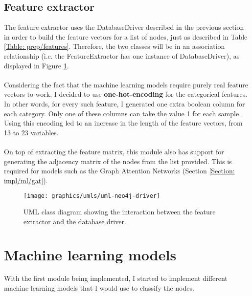 	\subsection{Feature extractor} \label{Section: impl/neo4j/features}
	The feature extractor uses the DatabaseDriver described in the previous section in order to build the feature vectors for a list of nodes, just as described in Table \ref{Table: prep/features}. Therefore, the two classes will be in an association relationship (i.e. the FeatureExtractor has one instance of DatabaseDriver), as displayed in Figure \ref{Fig: impl/neo4j-driver-uml}.
	\\ \\
	Considering the fact that the machine learning models require purely real feature vectors to work, I decided to use \textbf{one-hot-encoding} for the categorical features. In other words, for every such feature, I generated one extra boolean column for each category. Only one of these columns can take the value 1 for each sample. Using this encoding led to an increase in the length of the feature vectors, from 13 to 23 variables. 
	\\ \\
	On top of extracting the feature matrix, this module also has support for generating the adjacency matrix of the nodes from the list provided. This is required for models such as the Graph Attention Networks (Section \ref{Section: impl/ml/gat}).
	\begin{figure}[H]
		\centering
		\texttt{[image: graphics/umls/uml-neo4j-driver]}
		\caption[FeatureExtractor UML class diagram]{\centering UML class diagram showing the interaction between the feature extractor and the database driver.}
		\label{Fig: impl/neo4j-driver-uml}
	\end{figure}
	\section{Machine learning models} \label{Section: impl/ml}
	With the first module being implemented, I started to implement different machine learning models that I would use to classify the nodes. 
